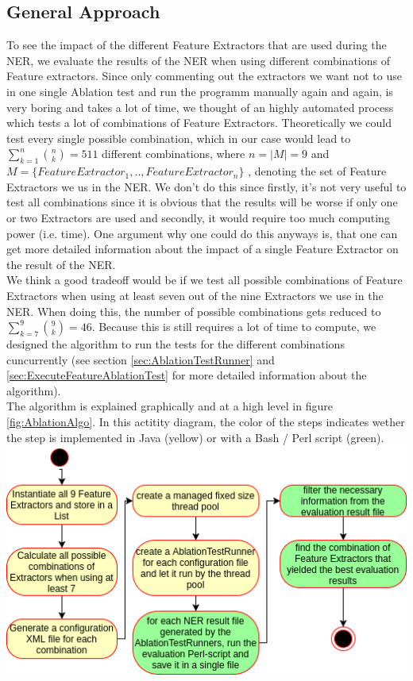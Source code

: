 \documentclass[11pt, english]{article}
\begin{document}
\subsection{General Approach}
\label{sec:AblationApproach}
To see the impact of the different Feature Extractors that are used during the NER, we evaluate the results of the NER when using different combinations of Feature extractors. Since only commenting out the extractors we want not to use in one single Ablation test and run the programm manually again and again, is very boring and takes a lot of time, we thought of an highly automated process which tests a lot of combinations of Feature Extractors. Theoretically we could test every single possible combination, which in our case would lead to $\sum_{k=1}^{n}\binom{n}{k} = 511$ different combinations, where $n = \left | M \right | = 9$ and $M = \{ FeatureExtractor_1, ..,  FeatureExtractor_n \}$ , denoting the set of Feature Extractors we us in the NER. We don't do this since firstly, it's not very useful to test all combinations since it is obvious that the results will be worse if only one or two Extractors are used and secondly, it would require too much computing power (i.e. time). One argument why one could do this anyways is, that one can get more detailed information about the impact of a single Feature Extractor on the result of the NER.\\
We think a good tradeoff would be if we test all possible combinations of Feature Extractors when using at least seven out of the nine Extractors we use in the NER. When doing this, the number of possible combinations gets reduced to $\sum_{k=7}^{9}\binom{9}{k} = 46$. Because this is still requires a lot of time to compute, we designed the algorithm to run the tests for the different combinations cuncurrently (see section \ref{sec:AblationTestRunner} and \ref{sec:ExecuteFeatureAblationTest} for more detailed information about the algorithm).\\
The algorithm is explained graphically and at a high level in figure \ref{fig:AblationAlgo}. In this actitity diagram, the color of the steps indicates wether the step is implemented in Java (yellow) or with a Bash / Perl script (green).\\

\includegraphics[scale=0.75]{gfx/ablationAlgo.png}
\label{fig:AblationAlgo}
\end{document}
